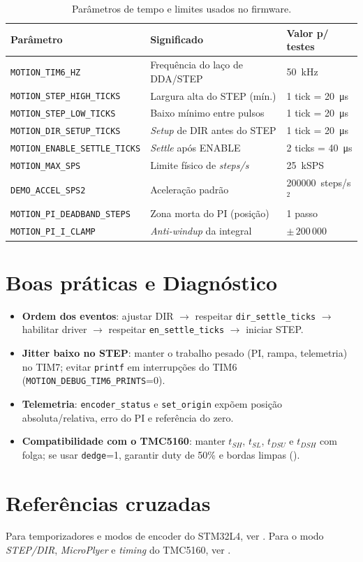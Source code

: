 \begin{table}[H]
  \centering
  \caption{Par\^ametros de tempo e limites usados no firmware.}
  \label{tab:param}
  \setlength{\tabcolsep}{4pt}\footnotesize
  \begin{tabularx}{\textwidth}{lXl}
    \toprule
    Par\^ametro & Significado & Valor p/ testes \\
    \midrule
    \texttt{MOTION\_TIM6\_HZ} & Frequ\^encia do la\c{c}o de DDA/STEP & \SI{50}{kHz} \\
    \texttt{MOTION\_STEP\_HIGH\_TICKS} & Largura alta do STEP (m\'in.) & 1 tick = \SI{20}{\micro s} \\
    \texttt{MOTION\_STEP\_LOW\_TICKS} & Baixo m\'inimo entre pulsos & 1 tick = \SI{20}{\micro s} \\
    \texttt{MOTION\_DIR\_SETUP\_TICKS} & \emph{Setup} de DIR antes do STEP & 1 tick = \SI{20}{\micro s} \\
    \texttt{MOTION\_ENABLE\_SETTLE\_TICKS} & \emph{Settle} ap\'os ENABLE & 2 ticks = \SI{40}{\micro s} \\
    \texttt{MOTION\_MAX\_SPS} & Limite f\'isico de \emph{steps/s} & \SI{25}{kSPS} \\
    \texttt{DEMO\_ACCEL\_SPS2} & Acelera\c{c}\~ao padr\~ao & \num{200000} \,steps/s$^{2}$ \\
    \texttt{MOTION\_PI\_DEADBAND\_STEPS} & Zona morta do PI (posi\c{c}\~ao) & 1 passo \\
    \texttt{MOTION\_PI\_I\_CLAMP} & \emph{Anti-windup} da integral & $\pm\,200\,000$ \\
    \bottomrule
  \end{tabularx}
\end{table}

\FloatBarrier
\section{Boas pr\'aticas e Diagn\'ostico}
\label{sec:boaspraticas}

\begin{itemize}
  \item \textbf{Ordem dos eventos}: ajustar DIR $\rightarrow$ respeitar \texttt{dir\_settle\_ticks} $\rightarrow$ habilitar driver $\rightarrow$ respeitar \texttt{en\_settle\_ticks} $\rightarrow$ iniciar STEP.
  \item \textbf{Jitter baixo no STEP}: manter o trabalho pesado (PI, rampa, telemetria) no TIM7; evitar \texttt{printf} em interrup\c{c}\~oes do TIM6 (\texttt{MOTION\_DEBUG\_TIM6\_PRINTS}=0).
  \item \textbf{Telemetria}: \texttt{encoder\_status} e \texttt{set\_origin} exp\~oem posi\c{c}\~ao absoluta/relativa, erro do PI e refer\^encia do zero.
  \item \textbf{Compatibilidade com o TMC5160}: manter $t_{SH}$, $t_{SL}$, $t_{DSU}$ e $t_{DSH}$ com folga; se usar \texttt{dedge}=1, garantir duty de 50\% e bordas limpas (\cite{tmc5160_ds}).
\end{itemize}

\FloatBarrier
\section{Refer\^encias cruzadas}
\label{sec:refs-cruzadas}

Para temporizadores e modos de encoder do STM32L4, ver \cite{stm32l4_rm}. Para o modo \emph{STEP/DIR}, \emph{MicroPlyer} e \emph{timing} do TMC5160, ver \cite{tmc5160_ds}.
